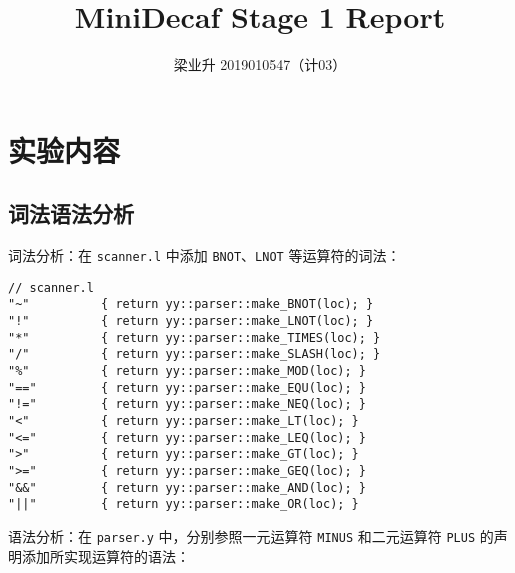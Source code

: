 \documentclass[a4paper]{article}
\author{梁业升 2019010547（计03）}
\begin{document}


\title{MiniDecaf Stage 1 Report}

\maketitle

\section{实验内容}

\subsection{词法语法分析}

词法分析：在 \texttt{scanner.l} 中添加 \texttt{BNOT}、\texttt{LNOT} 等运算符的词法：

\begin{lstlisting}
// scanner.l
"~"          { return yy::parser::make_BNOT(loc); }
"!"          { return yy::parser::make_LNOT(loc); }
"*"          { return yy::parser::make_TIMES(loc); }
"/"          { return yy::parser::make_SLASH(loc); }
"%"          { return yy::parser::make_MOD(loc); }
"=="         { return yy::parser::make_EQU(loc); }
"!="         { return yy::parser::make_NEQ(loc); }
"<"          { return yy::parser::make_LT(loc); }
"<="         { return yy::parser::make_LEQ(loc); }
">"          { return yy::parser::make_GT(loc); }
">="         { return yy::parser::make_GEQ(loc); }
"&&"         { return yy::parser::make_AND(loc); }
"||"         { return yy::parser::make_OR(loc); }
\end{lstlisting}

语法分析：在 \texttt{parser.y} 中，分别参照一元运算符 \texttt{MINUS} 和二元运算符 \texttt{PLUS} 的声明添加所实现运算符的语法：
\end{document}
